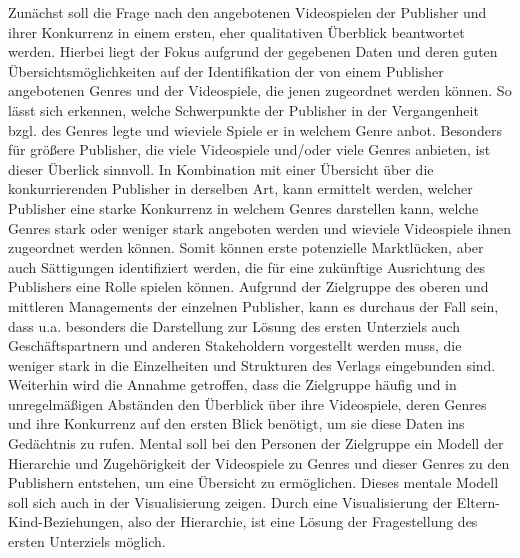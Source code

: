 \documentclass[usegeometry=true]{scrartcl}
\begin{document}
Zunächst soll die Frage nach den angebotenen Videospielen der Publisher und ihrer Konkurrenz in einem ersten, eher qualitativen Überblick beantwortet werden. 
Hierbei liegt der Fokus aufgrund der gegebenen Daten und deren guten Übersichtsmöglichkeiten auf der Identifikation der von einem Publisher angebotenen Genres und der Videospiele, die jenen zugeordnet werden können. 
So lässt sich erkennen, welche Schwerpunkte der Publisher in der Vergangenheit bzgl. des Genres legte und wieviele Spiele er in welchem Genre anbot. 
Besonders für größere Publisher, die viele Videospiele und/oder viele Genres anbieten, ist dieser Überlick sinnvoll.
In Kombination mit einer Übersicht über die konkurrierenden Publisher in derselben Art, kann ermittelt werden, welcher Publisher eine starke Konkurrenz in welchem Genres darstellen kann, welche Genres stark oder weniger stark angeboten werden und wieviele Videospiele ihnen zugeordnet werden können.
Somit können erste potenzielle Marktlücken, aber auch Sättigungen identifiziert werden, die für eine zukünftige Ausrichtung des Publishers eine Rolle spielen können. 
Aufgrund der Zielgruppe des oberen und mittleren Managements der einzelnen Publisher, kann es durchaus der Fall sein, dass u.a. besonders die Darstellung zur Lösung des ersten Unterziels auch Geschäftspartnern und anderen Stakeholdern vorgestellt werden muss, die weniger stark in die Einzelheiten und Strukturen des Verlags eingebunden sind. 
Weiterhin wird die Annahme getroffen, dass die Zielgruppe häufig und in unregelmäßigen Abständen den Überblick über ihre Videospiele, deren Genres und ihre Konkurrenz auf den ersten Blick benötigt, um sie diese Daten ins Gedächtnis zu rufen.
Mental soll bei den Personen der Zielgruppe ein Modell der Hierarchie und Zugehörigkeit der Videospiele zu Genres und dieser Genres zu den Publishern entstehen, um eine Übersicht zu ermöglichen. 
Dieses mentale Modell soll sich auch in der Visualisierung zeigen.
Durch eine Visualisierung der Eltern-Kind-Beziehungen, also der Hierarchie, ist eine Lösung der Fragestellung des ersten Unterziels möglich.
\end{document}
